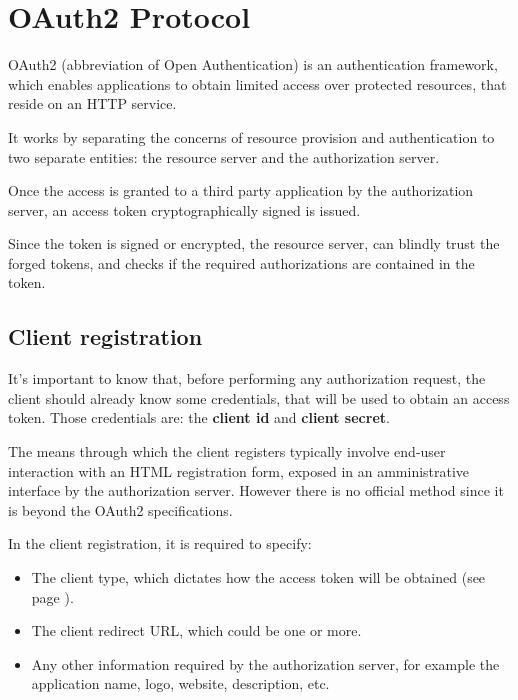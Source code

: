 
\section{OAuth2 Protocol}
OAuth2 (abbreviation of Open Authentication) is an authentication framework,
which enables applications to obtain limited access over protected resources,
that reside on an HTTP service.

It works by separating the concerns of resource provision and authentication to
two separate entities: the resource server and the authorization server.

Once the access is granted to a third party application by the authorization server,
an access token cryptographically signed is issued.

Since the token is signed or encrypted, the resource server, can blindly trust
the forged tokens, and checks if the required authorizations are contained in
the token.

\subsection{Client registration}
It's important to know that, before performing any authorization request, the
client should already know some credentials, that will be used to obtain an access token.
Those credentials are: the \textbf{client id} and \textbf{client secret}.

The means through which the client registers typically involve end-user
interaction with an HTML registration form, exposed in an amministrative
interface by the authorization server.
However there is no official method since it is beyond the OAuth2
specifications.

In the client registration, it is required to specify:
\begin{itemize}
    \item
        The client type, which dictates how the access token will be obtained
        (see page \pageref{sec:grant-types-overview}).

    \item The client redirect URL, which could be one or more.
    \item
        Any other information required by the authorization server, for example
        the application name, logo, website, description, etc.
\end{itemize}

